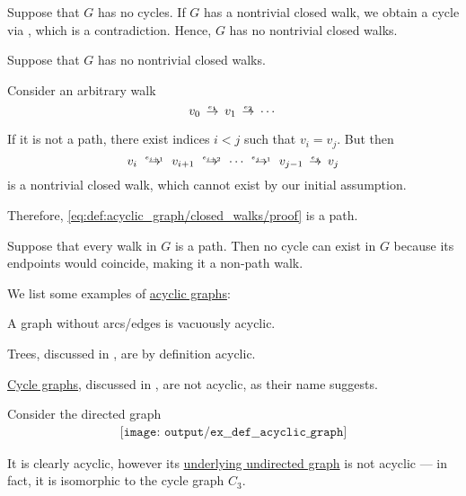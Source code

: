 \begin{defproof}
   Suppose that \( G \) has no cycles. If \( G \) has a nontrivial closed walk, we obtain a cycle via , which is a contradiction. Hence, \( G \) has no nontrivial closed walks.

   Suppose that \( G \) has no nontrivial closed walks.

  Consider an arbitrary walk
  \begin{equation}\label{eq:def:acyclic_graph/closed_walks/proof}
    v_0 \reloset {e_1} \to v_1 \reloset {e_2} \to \cdots
  \end{equation}

  If it is not a path, there exist indices \( i < j \) such that \( v_i = v_j \). But then
  \begin{equation*}
    v_i \reloset {e_{i+1}} \to v_{i+1} \reloset {e_{i+2}} \to \cdots \reloset {e_{j-1}} \to v_{j-1} \reloset {e_j} \to v_j
  \end{equation*}
  is a nontrivial closed walk, which cannot exist by our initial assumption.

  Therefore, \eqref{eq:def:acyclic_graph/closed_walks/proof} is a path.

   Suppose that every walk in \( G \) is a path. Then no cycle can exist in \( G \) because its endpoints would coincide, making it a non-path walk.
\end{defproof}

\begin{example}\label{ex:def:acyclic_graph}
  We list some examples of \hyperref[def:acyclic_graph]{acyclic graphs}:
  \begin{thmenum}
     A graph without arcs/edges is vacuously acyclic.

     Trees, discussed in , are by definition acyclic.

     \hyperref[def:cycle_graph]{Cycle graphs}, discussed in , are not acyclic, as their name suggests.

     Consider the directed graph
    \begin{equation}\label{eq:ex:def:acyclic_graph/forgetful}
      \begin{aligned}
        \texttt{[image: output/ex\_\_def\_\_acyclic\_graph]}
      \end{aligned}
    \end{equation}

    It is clearly acyclic, however its \hyperref[def:graph_functors/simple_forgetful]{underlying undirected graph} is not acyclic --- in fact, it is isomorphic to the cycle graph \( C_3 \).
  \end{thmenum}
\end{example}

